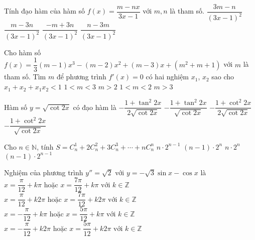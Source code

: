 \begin{ex}%
	Tính đạo hàm của hàm số $f(x)=\dfrac{m-nx}{3x-1}$ với $m, n$ là tham số.
	\choice
	{$\dfrac{3m-n}{(3x-1)^2}$}
	{$\dfrac{m-3n}{(3x-1)^2}$}
	{$\dfrac{-m+3n}{(3x-1)^2}$}
	{\True	$\dfrac{n-3m}{(3x-1)^2}$}
\end{ex}
\begin{ex}%
	Cho hàm số $f(x)=\dfrac{1}{3}(m-1)x^3-(m-2)x^2+(m-3)x+(m^2+m+1)$ với $m$ là tham số. Tìm $m$ để phương trình $f'(x)=0$ có hai nghiệm $x_1$, $x_2$ sao cho $x_1+x_2+x_1x_2<1$
	\choice
	{\True $1<m<3$}
	{$m>2$}
	{$1<m<2$}
	{$m>3$}
\end{ex}
\begin{ex}%
	Hàm số $y=\sqrt{\cot 2x}$ có đạo hàm là
	\choice
	{$-\dfrac{1+\tan^2 2x}{2\sqrt{\cot 2x}}$}
	{$-\dfrac{1+\tan^2 2x}{\sqrt{\cot 2x}}$}
	{$-\dfrac{1+\cot^2 2x}{2\sqrt{\cot 2x}}$}
	{\True$-\dfrac{1+\cot^2 2x}{\sqrt{\cot 2x}}$}
\end{ex}
\begin{ex}%
	Cho $n \in \mathbb{N}$, tính $S=C^1_n+2C^2_n+3C^3_n+\cdots + nC_n^n$
	\choice
	{\True $n\cdot2^{n-1}$}
	{$(n-1)\cdot2^{n}$}
	{$n\cdot2^{n}$}
	{$(n-1)\cdot2^{n-1}$}
\end{ex}
\begin{ex}%
	Nghiệm của phương trình $y''=\sqrt{2}$ với $y=-\sqrt{3}\sin x-\cos x$ là
	\choice
	{$x=\dfrac{\pi}{12}+k\pi \textrm{ hoặc }x=\dfrac{7\pi}{12}+k\pi \textrm{ với } k\in \mathbb{Z}$}
	{\True $x=\dfrac{\pi}{12}+k2\pi \textrm{ hoặc }x=\dfrac{7\pi}{12}+k2\pi \textrm{ với } k\in \mathbb{Z}$}
	{$x=-\dfrac{\pi}{12}+k\pi \textrm{ hoặc }x=\dfrac{5\pi}{12}+k\pi \textrm{ với } k\in \mathbb{Z}$}
	{$x=-\dfrac{\pi}{12}+k2\pi \textrm{ hoặc }x=\dfrac{5\pi}{12}+k2\pi \textrm{ với } k\in \mathbb{Z}$}
\end{ex}

